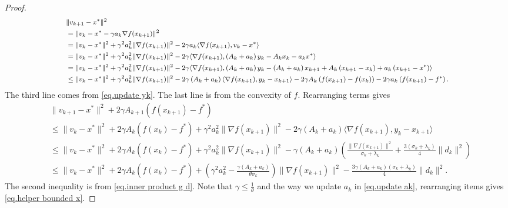 \documentclass{article}
\begin{document}
\begin{proof}
    \begin{equation*}
    \footnotesize
        \begin{aligned}
            &\|v_{k+1}-x^*\|^2\\
            &= \|v_k-x^* -\gamma a_k \nabla f(x_{k+1})\|^2 \\
            &= \|v_k-x^*\|^2 +\gamma^2 a_k^2 \|\nabla f(x_{k+1})\|^2 -2\gamma a_k \langle \nabla f(x_{k+1}),v_k-x^*\rangle\\
            &= \|v_k-x^*\|^2 +\gamma^2 a_k^2 \|\nabla f(x_{k+1})\|^2 -2\gamma \langle \nabla f(x_{k+1}), \left (A_k+a_k\right)y_k-A_k x_k-a_k x^* \rangle\\
            &=\|v_k-x^*\|^2 +\gamma^2 a_k^2 \|\nabla f(x_{k+1})\|^2-2\gamma \langle \nabla f(x_{k+1}), \left (A_k+a_k\right)y_k-\left(A_k+a_k\right)x_{k+1}+A_k\left(x_{k+1}- x_k\right)+a_k \left(x_{k+1}-x^*\right) \rangle\\
            &\leq\|v_k-x^*\|^2 +\gamma^2 a_k^2 \|\nabla f(x_{k+1})\|^2-2\gamma \left (A_k+a_k\right)\langle \nabla f(x_{k+1}), y_k-x_{k+1} \rangle-2\gamma A_k \left (f(x_{k+1})-f(x_k)\right)-2\gamma a_k\left (f(x_{k+1})-f^*\right).
        \end{aligned}
    \end{equation*}
    The third line comes from \eqref{eq.update yk}. The last line is from the convexity of $f$. Rearranging terms gives
    \begin{equation*}
    \begin{aligned}
        &\|v_{k+1}-x^*\|^2 +2\gamma A_{k+1} \left (f(x_{k+1})-f^*\right)\\
        &\leq \|v_k-x^*\|^2+2\gamma A_k \left (f(x_k)-f^*\right )+\gamma^2 a_k^2 \|\nabla f(x_{k+1})\|^2-2\gamma \left (A_k+a_k\right)\langle \nabla f(x_{k+1}), y_k-x_{k+1} \rangle\\
        &\leq\|v_k-x^*\|^2+2\gamma A_k \left (f(x_k)-f^*\right )+\gamma^2 a_k^2 \|\nabla f(x_{k+1})\|^2-\gamma \left (A_k+a_k\right)\left (\frac{\|\nabla f(x_{k+1})\|^2}{\sigma_k+\lambda_k}+\frac{3(\sigma_k+\lambda_k)}{4}\|d_k\|^2\right)\\
        &\leq \|v_k-x^*\|^2+2\gamma A_k \left (f(x_k)-f^*\right )+\left(\gamma^2 a_k^2-\frac{\gamma(A_k+a_k)}{\theta \sigma_k}\right)\|\nabla f(x_{k+1})\|^2 -\frac{3\gamma(A_k+a_k)(\sigma_k+\lambda_k)}{4}\|d_k\|^2.
    \end{aligned}
    \end{equation*}
    The second inequality is from \eqref{eq.inner product g d}. Note that $\gamma \leq \frac{1}{\theta}$ and the way we update $a_k$ in \eqref{eq.update ak}, rearranging items gives \eqref{eq.helper bounded x}.

\end{proof}
\end{document}
